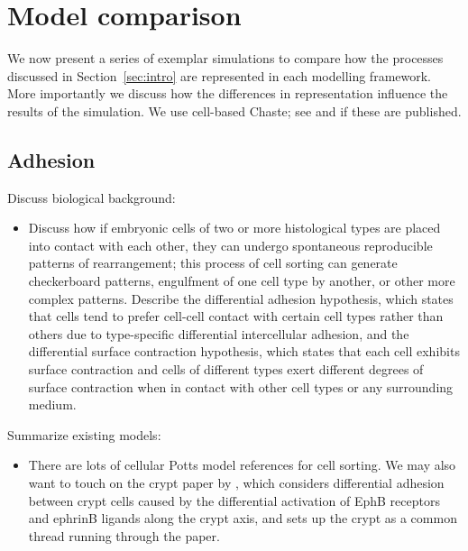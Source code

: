 \documentclass{article}
\begin{document}
\section{Model comparison}\label{sec:model_comparison}
We now present a series of exemplar simulations to compare how the processes discussed in Section~\ref{sec:intro} are represented in each modelling framework.
More importantly we discuss how the differences in representation influence the results of the simulation. 
We use cell-based Chaste; see \citet{Mirams2012Chaste} and \citet{Pitt-Francis2012} if these are published.

\subsection{Adhesion} \label{sec:adhesion}

Discuss biological background:
\begin{itemize}
\item Discuss how if embryonic cells of two or more histological types are placed into contact with each other, they can undergo spontaneous reproducible patterns of rearrangement; this process of cell sorting can generate checkerboard patterns, engulfment of one cell type by another, or other more complex patterns. Describe the differential adhesion hypothesis, which states that cells tend to prefer cell-cell contact with certain cell types rather than others due to type-specific differential intercellular adhesion, and the differential surface contraction hypothesis, which states that each cell exhibits surface contraction and cells of different types exert different degrees of surface contraction when in contact with other cell types or any surrounding medium.
\end{itemize}

\noindent Summarize existing models:
\begin{itemize}
\item There are lots of cellular Potts model references for cell sorting. We may also want to touch on the crypt paper by \citet{Wong2010Computational}, which considers differential adhesion between crypt cells caused by the differential activation of EphB receptors and ephrinB ligands along the crypt axis, and sets up the crypt as a common thread running through the paper.
\end{itemize}
\end{document}
